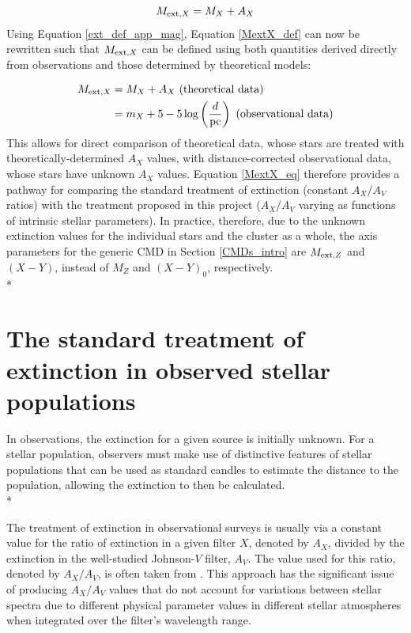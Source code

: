 \documentclass[12pt, a4paper]{report}
\begin{document}
\begin{equation}
M_{\textnormal{ext},X} = M_{X} + A_{X}
\label{MextX_def}
\end{equation}
Using Equation \ref{ext_def_app_mag}, Equation \ref{MextX_def} can now be rewritten such that $M_{\textnormal{ext},X}$ can be defined using both quantities derived directly from observations and those determined by theoretical models:

\begin{align}
\begin{split}
M_{\textnormal{ext},X} &= M_{X} + A_{X} \textnormal{ (theoretical data)}\\
 &= m_{X} + 5 - 5\log\left(\frac{d}{\textnormal{pc}}\right) \textnormal{ (observational data)}
\end{split}
\label{MextX_eq}
\end{align}
This allows for direct comparison of theoretical data, whose stars are treated with theoretically-determined $A_{X}$ values, with distance-corrected observational data, whose stars have unknown $A_{X}$ values. Equation \ref{MextX_eq} therefore provides a pathway for comparing the standard treatment of extinction (constant $A_{X}/A_{V}$ ratios) with the treatment proposed in this project ($A_{X}/A_{V}$ varying as functions of intrinsic stellar parameters). In practice, therefore, due to the unknown extinction values for the individual stars and the cluster as a whole, the axis parameters for the generic CMD in Section \ref{CMDs_intro} are $M_{\textnormal{ext},Z}$ and $(X-Y)$, instead of $M_{Z}$ and $(X-Y)_{0}$, respectively.\\*

\section{The standard treatment of extinction in observed stellar populations} \label{standard_ext}

In observations, the extinction for a given source is initially unknown. For a stellar population, observers must make use of distinctive features of stellar populations that can be used as standard candles to estimate the distance to the population, allowing the extinction to then be calculated. \\*

The treatment of extinction in observational surveys is usually via a constant value for the ratio of extinction in a given filter $X$, denoted by $A_{X}$, divided by the extinction in the well-studied Johnson-$V$ filter, $A_{V}$. The value used for this ratio, denoted by $A_{X}/A_{V}$, is often taken from \cite{1985ApJ...288..618R}. This approach has the significant issue of producing $A_{X}/A_{V}$ values that do not account for  variations between stellar spectra due to different physical parameter values in different stellar atmospheres when integrated over the filter's wavelength range.
\end{document}
